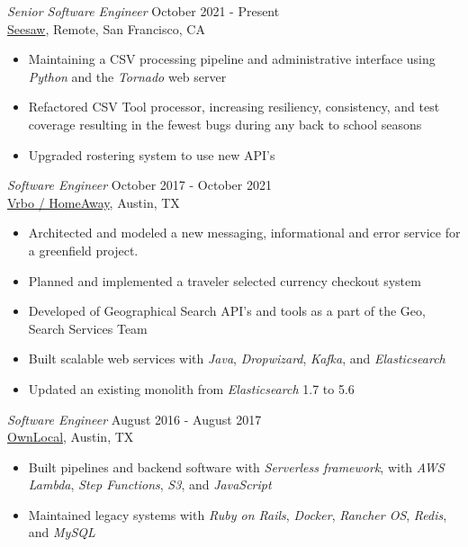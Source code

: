 \documentclass[margin, 10pt]{res} %
\begin{document}
\begin{resume}
{\sl Senior Software Engineer} \hfill October 2021 - Present \\
\href{https://web.seesaw.me/}{Seesaw}, Remote, San Francisco, CA
\begin{itemize}
    \item Maintaining a CSV processing pipeline and administrative interface using {\it Python} and the {\it Tornado} web server
    \item Refactored CSV Tool processor, increasing resiliency, consistency, and test coverage resulting in the fewest bugs during any back to school seasons
    \item Upgraded rostering system to use new API's
\end{itemize}

{\sl Software Engineer} \hfill October 2017 - October 2021 \\
\href{https://www.vrbo.com/}{Vrbo / HomeAway}, Austin, TX
\begin{itemize}
    \item Architected and modeled a new messaging, informational and error service for a greenfield project. 
    \item Planned and implemented a traveler selected currency checkout system
    \item Developed of Geographical Search API's and tools as a part of the Geo, Search Services Team
    \item Built scalable web services with {\it Java}, {\it Dropwizard}, {\it Kafka}, and {\it Elasticsearch}
    \item Updated an existing monolith from {\it Elasticsearch} 1.7 to 5.6
\end{itemize}


{\sl Software Engineer } \hfill August 2016 - August 2017 \\
\href{https://www.ownlocal.com}{OwnLocal}, Austin, TX
\begin{itemize}
    \item Built pipelines and backend software with {\it Serverless framework}, with {\it AWS Lambda}, {\it Step Functions}, {\it S3}, and {\it JavaScript}
    \item Maintained legacy systems with {\it Ruby on Rails}, {\it Docker}, {\it Rancher OS}, {\it Redis}, and {\it MySQL}
\end{itemize}


\end{resume}
\end{document}
